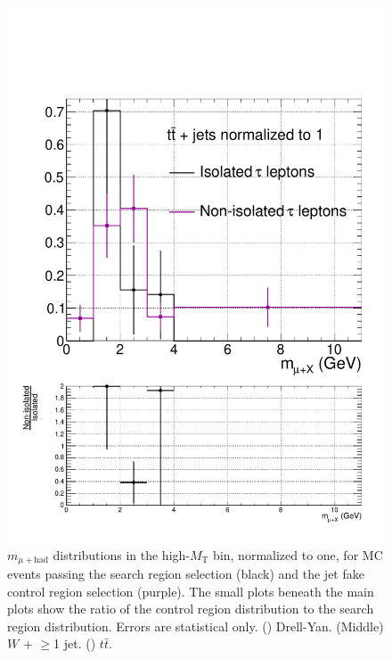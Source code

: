 \begin{figure}[hbtp]
\begin{center}
    \includegraphics[width=0.8\cmsFigWidth]{figures/isoVsNonIsoTaus_TTJets_highMT_v87}
    \caption{$m_{\mu+\text{had}}$ distributions in the high-$M_{\text{T}}$ bin, normalized to one, for MC events passing the search region selection (black) and the jet fake control region selection (purple).  The small plots beneath the main plots show the ratio of the control region distribution to the search region distribution.  Errors are statistical only.  (\cmsLeft) Drell-Yan.  (Middle) $W$ + $\ge$1 jet.  (\cmsRight) $t\bar{t}$.}
    \label{fig:MC-regA-vs-regB-main-highMT}
  \end{center}
\end{figure}

